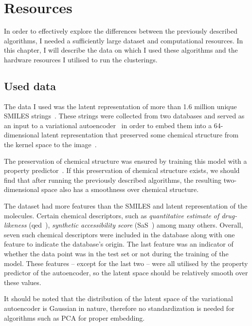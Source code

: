 \chapter{Resources}\label{ch:resources}

In order to effectively explore the differences between the previously described algorithms, I needed a sufficiently large dataset and computational resources. In this chapter, I will describe the data on which I used these algorithms and the hardware resources I utilised to run the clusterings.

\section{Used data}\label{sec:used-data}

The data I used was the latent representation of more than 1.6 million unique SMILES strings~\cite{bib:smiles}. These strings were collected from two databases and served as an input to a variational autoencoder~\cite{bib:vae} in order to embed them into a 64-dimensional latent representation that preserved some chemical structure from the kernel space to the image~\cite{bib:thesis}.

The preservation of chemical structure was ensured by training this model with a property predictor~\cite{bib:prop_pred}. If this preservation of chemical structure exists, we should find that after running the previously described algorithms, the resulting two-dimensional space also has a smoothness over chemical structure.

The dataset had more features than the SMILES and latent representation of the molecules. Certain chemical descriptors, such as \textit{quantitative estimate of drug-likeness} (qed~\cite{bib:qed}), \textit{synthetic accessibility score} (SaS~\cite{bib:sas}) among many others. Overall, seven such chemical descriptors were included in the database along with one feature to indicate the database's origin. The last feature was an indicator of whether the data point was in the test set or not during the training of the model. These features -- except for the last two -- were all utilised by the property predictor of the autoencoder, so the latent space should be relatively smooth over these values.

It should be noted that the distribution of the latent space of the variational autoencoder is Gaussian in nature, therefore no standardization is needed for algorithms such as PCA for proper embedding.

